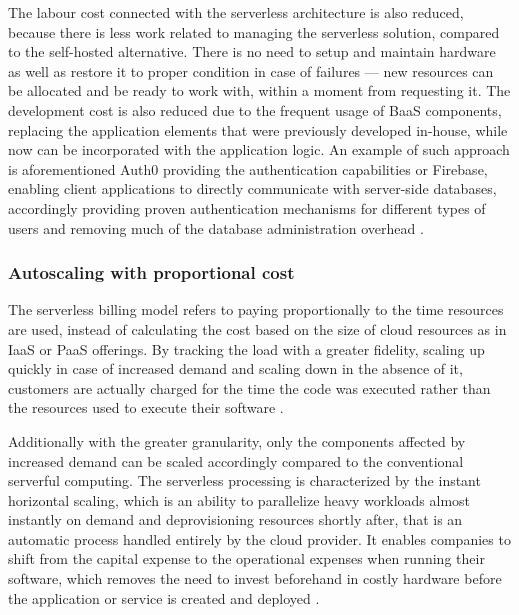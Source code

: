 The labour cost connected with the serverless architecture is also reduced, because there is less work related to managing the serverless solution, compared to the self-hosted alternative. There is no need to setup and maintain hardware as well as restore it to proper condition in case of failures --- new resources can be allocated and be ready to work with, within a moment from requesting it. The development cost is also reduced due to the frequent usage of BaaS components, replacing the application elements that were previously developed in-house, while now can be incorporated with the application logic. An example of such approach is aforementioned Auth0 providing the authentication capabilities or Firebase, enabling client applications to directly communicate with server-side databases, accordingly providing proven authentication mechanisms for different types of users and removing much of the database administration overhead \cite{MartinFowlerServerless}.

\subsubsection*{Autoscaling with proportional cost}

The serverless billing model refers to paying proportionally to the time resources are used, instead of calculating the cost based on the size of cloud resources as in IaaS or PaaS offerings. By tracking the load with a greater fidelity, scaling up quickly in case of increased demand and scaling down in the absence of it, customers are actually charged for the time the code was executed rather than the resources used to execute their software \cite{BerkeleyServerless}.

Additionally with the greater granularity, only the components affected by increased demand can be scaled accordingly compared to the conventional serverful computing. The serverless processing is characterized by the instant horizontal scaling, which is an ability to parallelize heavy workloads almost instantly on demand and deprovisioning resources shortly after, that is an automatic process handled entirely by the cloud provider. It enables companies to shift from the capital expense to the operational expenses when running their software, which removes the need to invest beforehand in costly hardware before the application or service is created and deployed \cite{LeveragingServerlessCloudComputingArchitectures}.

